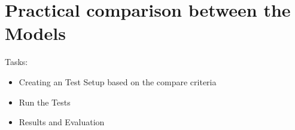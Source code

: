 \chapter{Practical comparison between the Models}
Tasks:
\begin{itemize}
    \item Creating an Test Setup based on the compare criteria
    \item Run the Tests
    \item Results and Evaluation
\end{itemize}